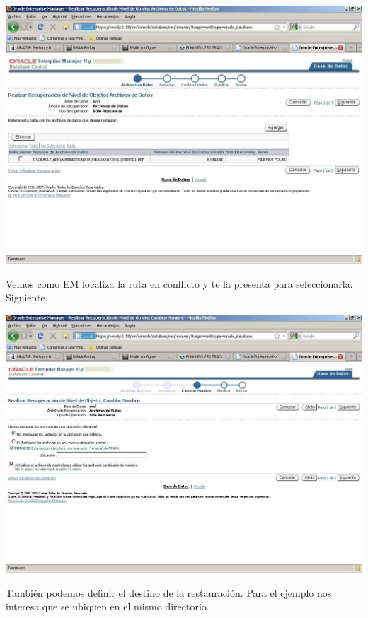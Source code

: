 \documentclass[a4paper,openright,12pt]{book}
\begin{document}
\begin{center}
\includegraphics[width=15cm]{./images/backup/11.jpg}
\end{center}
Vemos  como  EM  localiza  la  ruta  en  conflicto  y  te  la  presenta  para  seleccionarla. Siguiente.
\begin{center}
\includegraphics[width=15cm]{./images/backup/12.jpg}
\end{center}
También podemos definir el destino de la restauración. Para el ejemplo nos interesa que se ubiquen en el mismo directorio.
\end{document}
